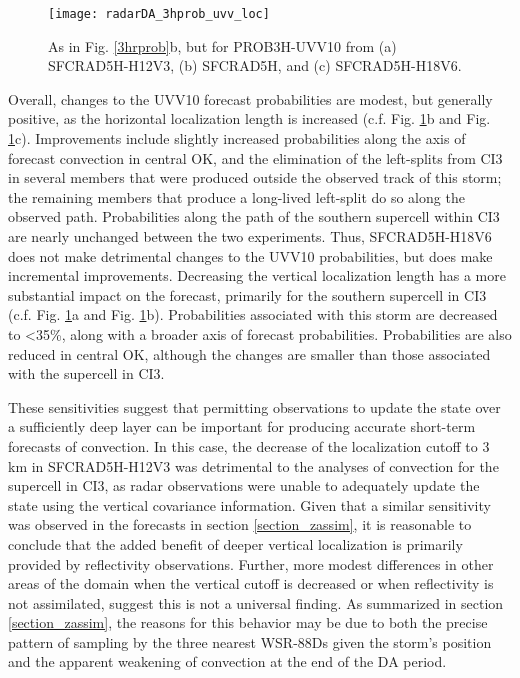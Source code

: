\begin{figure}
\centering
\texttt{[image: radarDA\_3hprob\_uvv\_loc]}
\caption{As in Fig. \ref{3hrprob}b, but for PROB3H-UVV10 from (a) SFCRAD5H-H12V3, (b) SFCRAD5H, and (c) SFCRAD5H-H18V6.}
\label{probuvvloc}
\end{figure}

Overall, changes to the UVV10 forecast probabilities are modest, but generally positive, as the horizontal localization length is increased (c.f. Fig. \ref{probuvvloc}b and Fig. \ref{probuvvloc}c). Improvements include slightly increased probabilities along the axis of forecast convection in central OK, and the elimination of the left-splits from CI3 in several members that were produced outside the observed track of this storm; the remaining members that produce a long-lived left-split do so along the observed path. Probabilities along the path of the southern supercell within CI3 are nearly unchanged between the two experiments. Thus, SFCRAD5H-H18V6 does not make detrimental changes to the UVV10 probabilities, but does make incremental improvements. Decreasing the vertical localization length has a more substantial impact on the forecast, primarily for the southern supercell in CI3 (c.f. Fig. \ref{probuvvloc}a and Fig. \ref{probuvvloc}b). Probabilities associated with this storm are decreased to \textless 35\%, along with a broader axis of forecast probabilities. Probabilities are also reduced in central OK, although the changes are smaller than those associated with the supercell in CI3.

These sensitivities suggest that permitting observations to update the state over a sufficiently deep layer can be important for producing accurate short-term forecasts of convection. In this case, the decrease of the localization cutoff to 3 km in SFCRAD5H-H12V3 was detrimental to the analyses of convection for the supercell in CI3, as radar observations were unable to adequately update the state using the vertical covariance information. Given that a similar sensitivity was observed in the forecasts in section \ref{section_zassim}, it is reasonable to conclude that the added benefit of deeper vertical localization is primarily provided by reflectivity observations. Further, more modest differences in other areas of the domain when the vertical cutoff is decreased or when reflectivity is not assimilated, suggest this is not a universal finding. As summarized in section \ref{section_zassim}, the reasons for this behavior may be due to both the precise pattern of sampling by the three nearest WSR-88Ds given the storm's position and the apparent weakening of convection at the end of the DA period. 

